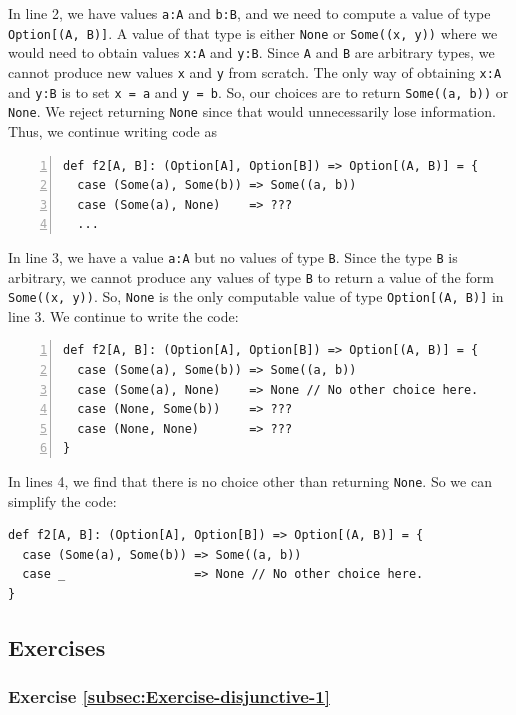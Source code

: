 \noindent In line 2, we have values \lstinline!a:A! and \lstinline!b:B!,
and we need to compute a value of type \lstinline!Option[(A, B)]!.
A value of that type is either \lstinline!None! or \lstinline!Some((x, y))!
where we would need to obtain values \lstinline!x:A! and \lstinline!y:B!.
Since \lstinline!A! and \lstinline!B! are arbitrary types, we cannot
produce new values \lstinline!x! and \lstinline!y! from scratch.
The only way of obtaining \lstinline!x:A! and \lstinline!y:B! is
to set \lstinline!x = a! and \lstinline!y = b!. So, our choices
are to return \lstinline!Some((a, b))! or \lstinline!None!. We reject
returning \lstinline!None! since that would unnecessarily lose information.
Thus, we continue writing code as
\begin{lstlisting}[numbers=left]
def f2[A, B]: (Option[A], Option[B]) => Option[(A, B)] = {
  case (Some(a), Some(b)) => Some((a, b))
  case (Some(a), None)    => ???
  ...
\end{lstlisting}
In line 3, we have a value \lstinline!a:A! but no values of type
\lstinline!B!. Since the type \lstinline!B! is arbitrary, we cannot
produce any values of type \lstinline!B! to return a value of the
form \lstinline!Some((x, y))!. So, \lstinline!None! is the only
computable value of type \lstinline!Option[(A, B)]! in line 3. We
continue to write the code:
\begin{lstlisting}[numbers=left]
def f2[A, B]: (Option[A], Option[B]) => Option[(A, B)] = {
  case (Some(a), Some(b)) => Some((a, b))
  case (Some(a), None)    => None // No other choice here.
  case (None, Some(b))    => ???
  case (None, None)       => ???
}
\end{lstlisting}
In lines 4, we find that there is no choice other than
returning \lstinline!None!. So we can simplify the code:
\begin{lstlisting}
def f2[A, B]: (Option[A], Option[B]) => Option[(A, B)] = {
  case (Some(a), Some(b)) => Some((a, b))
  case _                  => None // No other choice here.
}
\end{lstlisting}


\subsection{Exercises}

\subsubsection{Exercise \label{subsec:Exercise-disjunctive-1}\ref{subsec:Exercise-disjunctive-1}}

